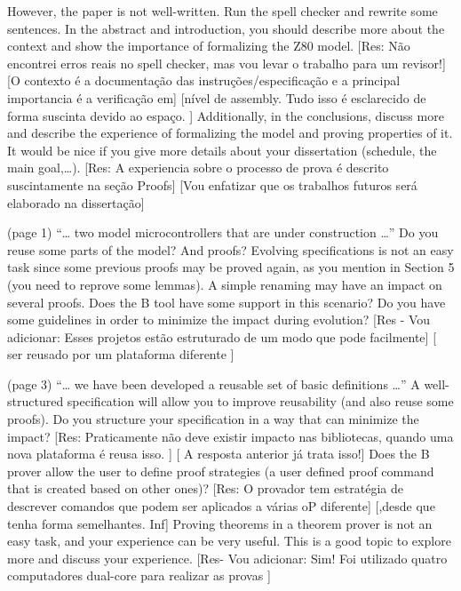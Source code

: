 However, the paper is not well-written. Run the spell checker and rewrite some
sentences. In the abstract and introduction, you should describe more about the
context and show the importance of formalizing the Z80 model.
[Res: Não encontrei erros reais no spell checker, mas vou levar o trabalho para um revisor!]
[O contexto é a documentação das instruções/especificação e a principal importancia é a verificação em]
[nível de assembly. Tudo isso é esclarecido de forma suscinta devido ao espaço. ]
Additionally, in the conclusions, discuss more and describe the experience of formalizing the
model and proving properties of it. It would be nice if you give more details
about your dissertation (schedule, the main goal,…).
[Res: A experiencia sobre o processo de prova é descrito suscintamente na seção Proofs]
[Vou enfatizar que os trabalhos futuros será elaborado na dissertação]



(page 1) “… two model microcontrollers that are under construction …” Do you
reuse some parts of the model? And proofs? Evolving specifications is not an easy
task since some previous proofs may be proved again, as you mention in Section 5
(you need to reprove some lemmas). A simple renaming may have an impact on
several proofs. Does the B tool have some support in this scenario? Do you have
some guidelines in order to minimize the impact during evolution?
[Res - Vou adicionar: Esses projetos estão estruturado de um modo que pode facilmente]
[ ser reusado por um plataforma diferente ]



(page 3) “… we have been developed a reusable set of basic definitions …” A
well-structured specification will allow you to improve reusability (and also
reuse some proofs). Do you structure your specification in a way that can
minimize the impact?
[Res: Praticamente não deve existir impacto nas bibliotecas, quando uma nova plataforma é reusa isso. ]
[ A resposta anterior já trata isso!]
Does the B prover allow the user to define proof strategies (a user defined proof
command that is created based on other ones)?
[Res: O provador tem estratégia de descrever comandos que podem ser aplicados a várias oP diferente]
[,desde que tenha forma semelhantes. Inf] Proving theorems in a theorem prover is not an easy task, 
and your experience can be very useful. This is a good topic to explore more and discuss your experience.
[Res- Vou adicionar: Sim! Foi utilizado quatro computadores dual-core para realizar as provas  ]



